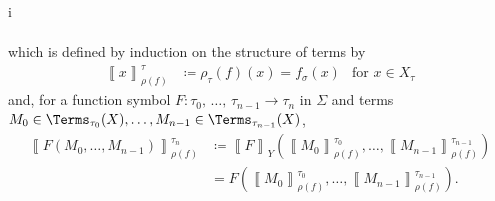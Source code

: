 \begin{partsolution}{i}
\begin{description}
\begin{align*}
\end{align*}
which is defined by induction on the structure of terms by
\begin{align*}
\left\llbracket x \right\rrbracket_{\rho(f)}^\tau &\coloneq \rho_\tau(f)(x) = f_\sigma(x) &\text{for \(x \in X_\tau\)}
\end{align*}
and, for a function symbol \(F : \tau_0,\,\ldots,\,\tau_{n-1} \to \tau_n\) in \(\Sigma\) and terms \(M_0 \in \Terms_{\tau_0}(X), \ldots, M_{n-1} \in \Terms_{\tau_{n-1}}(X)\),
\begin{align*}
\left\llbracket F(M_0,\ldots,M_{n-1}) \right\rrbracket_{\rho(f)}^{\tau_n}
&\coloneq \left\llbracket F \right\rrbracket_Y\left(\left\llbracket M_0 \right\rrbracket_{\rho(f)}^{\tau_0}, \ldots, \left\llbracket M_{n-1} \right\rrbracket_{\rho(f)}^{\tau_{n-1}}\right) \\
&= F \left(\left\llbracket M_0 \right\rrbracket_{\rho(f)}^{\tau_0}, \ldots, \left\llbracket M_{n-1} \right\rrbracket_{\rho(f)}^{\tau_{n-1}}\right).
\end{align*}
\end{description}
\end{partsolution}
